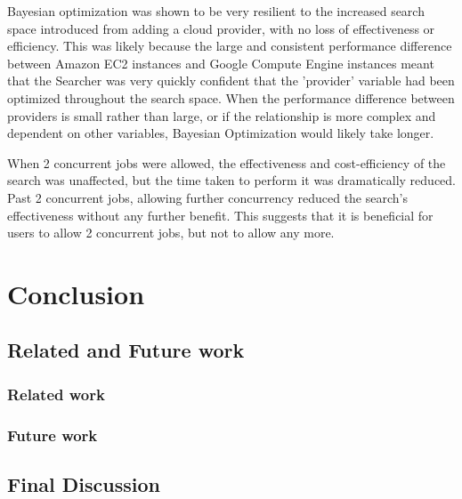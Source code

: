\documentclass{report}
\begin{document}
Bayesian optimization was shown to be very resilient to the increased search space introduced from adding a cloud provider, with no loss of effectiveness or efficiency. This was likely because the large and consistent performance difference between Amazon EC2 instances and Google Compute Engine instances meant that the Searcher was very quickly confident that the 'provider' variable had been optimized throughout the search space. When the performance difference between providers is small rather than large, or if the relationship is more complex and dependent on other variables, Bayesian Optimization would likely take longer.

When 2 concurrent jobs were allowed, the effectiveness and cost-efficiency of the search was unaffected, but the time taken to perform it was dramatically reduced. Past 2 concurrent jobs, allowing further concurrency reduced the search's effectiveness without any further benefit. This suggests that it is beneficial for users to allow 2 concurrent jobs, but not to allow any more. 
\chapter{Conclusion}
\section{Related and Future work}
\subsection{Related work}
\subsection{Future work}
\section{Final Discussion}
\newpage


\newpage
\end{document}
